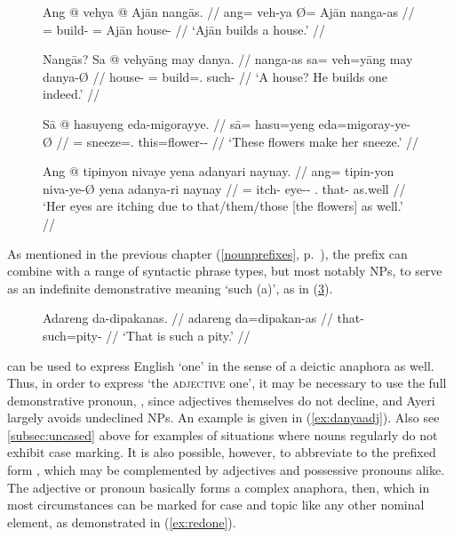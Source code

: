 \begin{figure}[h]
\pex\label{ex:demproanaph1}
\a\begingl
	\gla Ang @ vehya {} @ Ajān nangās. //
	\glb ang= veh-ya Ø= Ajān nanga-as //
	\glc \AgtT{}= build-\TsgM{} \Top{}= Ajān house-\Parg{} //
	\glft `Ajān builds a house.' //
\endgl

\a\begingl
	\gla Nangās? Sa @ vehyāng may danya. //
	\glb nanga-as sa= veh=yāng may danya-Ø //
	\glc house-\Parg{} \PatT{}= build=\TsgM{}.\Aarg{} \Aff{} such-\Top{} //
	\glft `A house? He builds one indeed.' //
\endgl

\xe
\end{figure}

\begin{figure}[h]
\pex\label{ex:demproanaph2}
\a\begingl
	\gla Sā @ hasuyeng eda-migorayye. //
	\glb sā= hasu=yeng eda=migoray-ye-Ø //
	\glc \CauT{}= sneeze=\TsgF{}.\Aarg{} this=flower-\Pl{}-\Top{} //
	\glft `These flowers make her sneeze.' //
\endgl

\a\begingl
	\gla Ang @ tipinyon nivaye yena adanyari naynay. //
	\glb ang= tipin-yon niva-ye-Ø yena adanya-ri naynay //
	\glc \AgtT{}= itch-\TplN{} eye-\Pl{}-\Top{} \TsgF{}.\Gen{} that-\Caus{} 
		as.well //
	\glft `Her eyes are itching due to that/them/those [the flowers] as 
		well.' //
\endgl
\xe
\end{figure}

As mentioned in the previous chapter (\autoref{nounprefixes},
p.~\pageref{nounprefixes}), the prefix  can combine
with a range of syntactic phrase types, but most notably NPs, to serve as an
indefinite demonstrative meaning `such (a)', as in (\ref{ex:danoun}).

\begin{figure}[h]
\ex\label{ex:danoun}%
\begingl
	\gla Adareng da-dipakanas. //
	\glb adareng da=dipakan-as //
	\glc that-\AargI{} such=pity-\Parg{} //
	\glft `That is such a pity.' //
\endgl
\xe
\end{figure}

 can be used to express English `one' in the sense of a deictic
anaphora as well. Thus, in order to express `the \textsc{adjective} one', it
may be necessary to use the full demonstrative pronoun, ,
since adjectives themselves do not decline, and Ayeri largely avoids undeclined
NPs. An example is given in (\ref{ex:danyaadj}). Also see
\autoref{subsec:uncased} above for examples of situations where nouns regularly
do not exhibit case marking. It is also possible, however, to abbreviate
 to the prefixed form , which may be
complemented by adjectives and possessive pronouns alike. The adjective or
pronoun basically forms a complex anaphora, then, which in most circumstances
can be marked for case and topic like any other nominal element, as
demonstrated in (\ref{ex:redone}).

